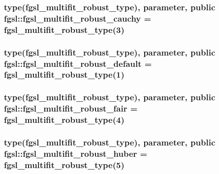 \subsubsection[{fgsl\+\_\+multifit\+\_\+robust\+\_\+cauchy}]{\setlength{\rightskip}{0pt plus 5cm}type({\bf fgsl\+\_\+multifit\+\_\+robust\+\_\+type}), parameter, public fgsl\+::fgsl\+\_\+multifit\+\_\+robust\+\_\+cauchy = {\bf fgsl\+\_\+multifit\+\_\+robust\+\_\+type}(3)}\label{namespacefgsl_a106b8dc39c3609e38744526153f66d25}
\hypertarget{namespacefgsl_ac1a0aa1e007066fb5ae50fcae0e1c885}{}
\subsubsection[{fgsl\+\_\+multifit\+\_\+robust\+\_\+default}]{\setlength{\rightskip}{0pt plus 5cm}type({\bf fgsl\+\_\+multifit\+\_\+robust\+\_\+type}), parameter, public fgsl\+::fgsl\+\_\+multifit\+\_\+robust\+\_\+default = {\bf fgsl\+\_\+multifit\+\_\+robust\+\_\+type}(1)}\label{namespacefgsl_ac1a0aa1e007066fb5ae50fcae0e1c885}
\hypertarget{namespacefgsl_a924cc37b78fb66006a7353005347bded}{}
\subsubsection[{fgsl\+\_\+multifit\+\_\+robust\+\_\+fair}]{\setlength{\rightskip}{0pt plus 5cm}type({\bf fgsl\+\_\+multifit\+\_\+robust\+\_\+type}), parameter, public fgsl\+::fgsl\+\_\+multifit\+\_\+robust\+\_\+fair = {\bf fgsl\+\_\+multifit\+\_\+robust\+\_\+type}(4)}\label{namespacefgsl_a924cc37b78fb66006a7353005347bded}
\hypertarget{namespacefgsl_a3f232d8677261e46e3b90159cdbe985a}{}
\subsubsection[{fgsl\+\_\+multifit\+\_\+robust\+\_\+huber}]{\setlength{\rightskip}{0pt plus 5cm}type({\bf fgsl\+\_\+multifit\+\_\+robust\+\_\+type}), parameter, public fgsl\+::fgsl\+\_\+multifit\+\_\+robust\+\_\+huber = {\bf fgsl\+\_\+multifit\+\_\+robust\+\_\+type}(5)}\label{namespacefgsl_a3f232d8677261e46e3b90159cdbe985a}
\hypertarget{namespacefgsl_a21550651577589ca5adf0cdd17517848}{}
